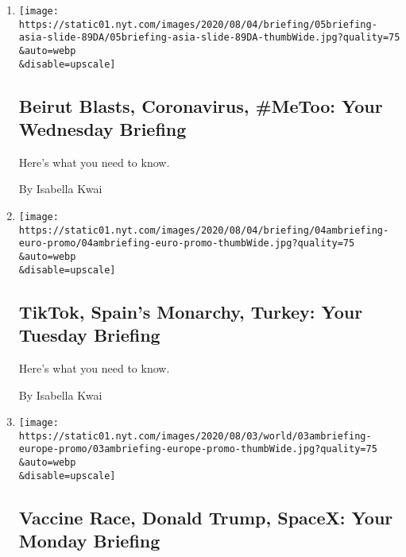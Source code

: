 \begin{enumerate}
\def\labelenumi{\arabic{enumi}.}
\item
  \href{/2020/08/05/briefing/beirut-blasts-coronavirus-metoo.html}{}

  \texttt{[image: https://static01.nyt.com/images/2020/08/04/briefing/05briefing-asia-slide-89DA/05briefing-asia-slide-89DA-thumbWide.jpg?quality=75\\\&auto=webp\\\&disable=upscale]}

  \hypertarget{beirut-blasts-coronavirus-metoo-your-wednesday-briefing}{%
  \subsection{Beirut Blasts, Coronavirus, \#MeToo: Your Wednesday
  Briefing}\label{beirut-blasts-coronavirus-metoo-your-wednesday-briefing}}

  Here's what you need to know.

  By Isabella Kwai
\item
  \href{/2020/08/03/briefing/tiktok-spain-turkey.html}{}

  \texttt{[image: https://static01.nyt.com/images/2020/08/04/briefing/04ambriefing-euro-promo/04ambriefing-euro-promo-thumbWide.jpg?quality=75\\\&auto=webp\\\&disable=upscale]}

  \hypertarget{tiktok-spains-monarchy-turkey-your-tuesday-briefing}{%
  \subsection{TikTok, Spain's Monarchy, Turkey: Your Tuesday
  Briefing}\label{tiktok-spains-monarchy-turkey-your-tuesday-briefing}}

  Here's what you need to know.

  By Isabella Kwai
\item
  \href{/2020/08/02/briefing/vaccine-race-donald-trump-spacex.html}{}

  \texttt{[image: https://static01.nyt.com/images/2020/08/03/world/03ambriefing-europe-promo/03ambriefing-europe-promo-thumbWide.jpg?quality=75\\\&auto=webp\\\&disable=upscale]}

  \hypertarget{vaccine-race-donald-trump-spacex-your-monday-briefing}{%
  \subsection{Vaccine Race, Donald Trump, SpaceX: Your Monday
  Briefing}\label{vaccine-race-donald-trump-spacex-your-monday-briefing}}


\end{enumerate}
